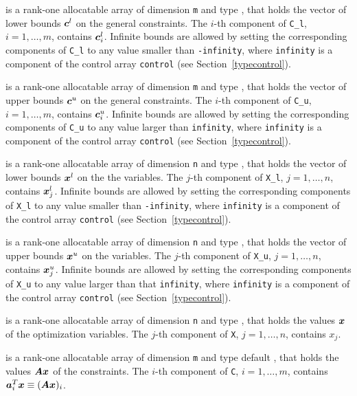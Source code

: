 \documentclass{galahad}
\begin{document}
\begin{description}
\begin{description}
\end{description}

 is a rank-one allocatable array of dimension {\tt m} and type
\realdp, that holds the vector of lower bounds ${\bm{c}}^{l}$
on the general constraints. The $i$-th component of
{\tt C\_l}, $i = 1, \ldots , m$, contains ${\bm{c}}_{i}^{l}$.
Infinite bounds are allowed by setting the corresponding
components of {\tt C\_l} to any value smaller than {\tt -infinity},
where {\tt infinity} is a component of the control array {\tt control}
(see Section~\ref{typecontrol}).

 is a rank-one allocatable array of dimension {\tt m} and type
\realdp, that holds the vector of upper bounds ${\bm{c}}^{u}$
on the general constraints. The $i$-th component of
{\tt C\_u}, $i = 1,  \ldots ,  m$, contains ${\bm{c}}_{i}^{u}$.
Infinite bounds are allowed by setting the corresponding
components of {\tt C\_u} to any value larger than {\tt infinity},
where {\tt infinity} is a component of the control array {\tt control}
(see Section~\ref{typecontrol}).

 is a rank-one allocatable array of dimension {\tt n} and type
\realdp, that holds
the vector of lower bounds ${\bm{x}}^{l}$ on the the variables.
The $j$-th component of {\tt X\_l}, $j = 1, \ldots , n$,
contains ${\bm{x}}_{j}^{l}$.
Infinite bounds are allowed by setting the corresponding
components of {\tt X\_l} to any value smaller than {\tt -infinity},
where {\tt infinity} is a component of the control array {\tt control}
(see Section~\ref{typecontrol}).

 is a rank-one allocatable array of dimension {\tt n} and type
\realdp, that holds
the vector of upper bounds ${\bm{x}}^{u}$ on the variables.
The $j$-th component of {\tt X\_u}, $j = 1, \ldots , n$,
contains ${\bm{x}}_{j}^{u}$.
Infinite bounds are allowed by setting the corresponding
components of {\tt X\_u} to any value larger than that {\tt infinity},
where {\tt infinity} is a component of the control array {\tt control}
(see Section~\ref{typecontrol}).

 is a rank-one allocatable array of dimension {\tt n} and type
\realdp,
that holds the values ${\bm{x}}$ of the optimization variables.
The $j$-th component of {\tt X}, $j = 1,  \ldots , n$, contains $x_{j}$.

 is a rank-one allocatable array of dimension {\tt m} and type default
\realdp, that holds
the values ${\bm{A}} {\bm{x}}$ of the constraints.
The $i$-th component of {\tt C}, $i = 1,  \ldots ,  m$, contains
${\bm{a}}_{i}^{T}{\bm{x}} \equiv ({\bm{A}} {\bm{x}})_{i}$.


\end{description}
\end{document}
